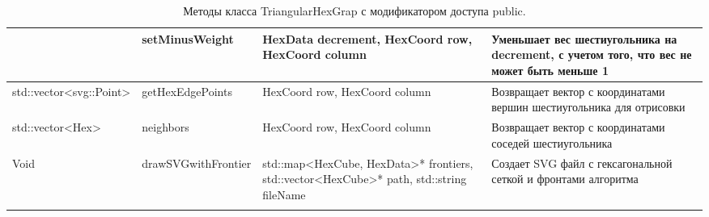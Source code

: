 \begin{longtable}[c]{|p{2.2cm}|p{2.1cm}|p{2.2cm}|p{7.6cm}|}
                                                          & setMinus\-Weight                    & HexData decrement, HexCoord row, HexCoord column                                                                                      & Уменьшает вес шестиугольника на decrement, с учетом того, что вес не может быть меньше 1 \\ \hline
std::vector\-\textless{}svg::\-Point\textgreater{}            & getHex\-Edge\-Points                  & HexCoord row, HexCoord column                                                                                                         & Возвращает вектор с координатами вершин шестиугольника для отрисовки                     \\ \hline
std::vector\-\textless{}Hex\textgreater{}                   & neighbors                         & HexCoord row, HexCoord column                                                                                                         & Возвращает  вектор с координатами соседей шестиугольника                                 \\ \hline
Void                                                      & drawSVG\-with\-Frontier               & std::map\-\textless{}Hex\-Cube, Hex\-Data\textgreater{}* frontiers, std::vector\-\textless{}Hex\-Cube\textgreater{}* path, std::string fileName & Создает SVG файл с гексагональной сеткой и фронтами алгоритма                            \\ \hline
\caption{Методы класса TriangularHexGrap с модификатором доступа public.}
\label{my-label}\\
\end{longtable}